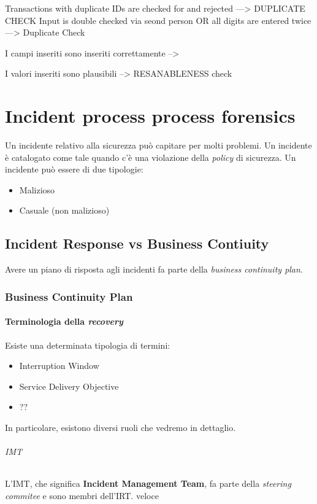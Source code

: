 
Transactions with duplicate IDs are checked for and rejected ---> DUPLICATE
CHECK
Input is double checked via seond person OR all digits are entered twice --->
Duplicate Check

I campi inseriti sono inseriti correttamente -->


I valori inseriti sono plausibili --> RESANABLENESS check


\part{Incident process process forensics}

Un incidente relativo alla sicurezza può capitare per molti problemi. Un
incidente è catalogato come tale quando c'è una violazione della \textit{policy}
di sicurezza. Un incidente può essere di due tipologie:
\begin{itemize}
\item Malizioso
\item Casuale (non malizioso)
\end{itemize}

\chapter{Incident Response vs Business Contiuity}

Avere un piano di risposta agli incidenti fa parte della \textit{business
continuity plan}.

\section{Business Continuity Plan}

\subsection{Terminologia della \textit{recovery}}
Esiste una determinata tipologia di termini:
\begin{itemize}
\item Interruption Window
\item Service Delivery Objective
\item ?? 
\end{itemize}

In particolare, esistono diversi ruoli che vedremo in dettaglio.

\paragraph*{IMT} L'IMT, che significa \textbf{Incident Management Team}, fa
parte della \textit{steering commitee} e sono membri dell'IRT. %
veloce




